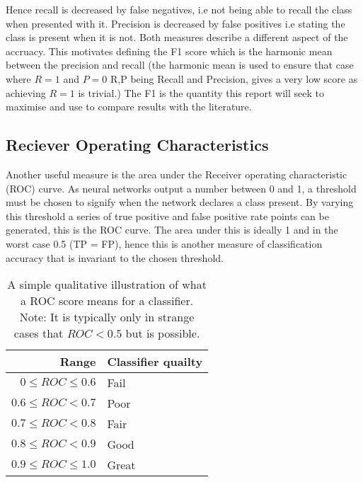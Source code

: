       Hence recall is decreased by false negatives, i.e not being able to recall the class
      when presented with it. Precision is decreased by false positives i.e stating the class
      is present when it is not. Both measures describe a different aspect of the accruacy. This
      motivates defining the F1 score which is the harmonic mean between the precision and recall
      (the harmonic mean is used to ensure that case where $R=1$ and $P=0$ R,P being Recall and Precision, gives
      a very low score  as achieving $R=1$ is trivial.) The F1 is the quantity this report will seek to maximise and use to compare
      results with the literature.
    \subsection{Reciever Operating Characteristics}
      Another useful measure is the area under the Receiver operating characteristic (ROC) curve.
      As neural networks output a number between 0 and 1, a threshold must be chosen to signify
      when the network declares a class present. By varying this threshold a series of true positive and false positive rate points
      can be generated, this is the ROC curve. The area under this is ideally 1 and in the worst case 0.5 (TP = FP), hence this is
      another measure of classification accuracy that is invariant to the chosen threshold.

      \begin{table}[]
        \centering \caption{A simple qualitative illustration of what a ROC score means for a classifier.
        Note: It is typically only in strange cases that $ROC< 0.5$ but is possible.} \label{my-label}
        \begin{tabular}{rl}
          \hline
          Range & Classifier quailty \\ \hline
          $0 \leq ROC \leq 0.6$   & Fail               \\
          $0.6 \leq ROC    < 0.7$   & Poor               \\
          $0.7 \leq ROC    < 0.8$   & Fair               \\
          $0.8 \leq ROC    < 0.9$   & Good               \\
          $0.9 \leq ROC \leq 1.0$   & Great              \\ \hline
        \end{tabular}
    \end{table}
